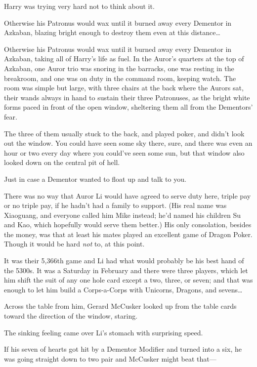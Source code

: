 Harry was trying very hard not to think about it.

Otherwise his Patronus would wax until it burned away every Dementor in
Azkaban, blazing bright enough to destroy them even at this distance{\ldots}

Otherwise his Patronus would wax until it burned away every Dementor in
Azkaban, taking all of Harry's life as fuel.
\later
In the Auror's quarters at the top of Azkaban, one Auror trio was snoring in
the barracks, one was resting in the breakroom, and one
was on duty in the command room, keeping watch. The room was
simple but large, with three chairs at the back where the Aurors sat, their wands
always in hand to sustain their three Patronuses, as the bright white forms
paced in front of the open window, sheltering them all from the Dementors' fear.

The three of them usually stuck to the back, and played poker, and didn't look
out the window. You could have seen some sky there, sure, and there was even an
hour or two every day where you could've seen some sun, but that window also
looked down on the central pit of hell.

Just in case a Dementor wanted to float up and talk to you.

There was no way that Auror Li would have agreed to serve duty here, triple pay
or no triple pay, if he hadn't had a family to support. (His real name was
Xiaoguang, and everyone called him Mike instead; he'd named his children Su and
Kao, which hopefully would serve them better.) His only consolation, besides
the money, was that at least his mates played an excellent game of Dragon
Poker. Though it would be hard \emph{not} to, at this point.

It was their 5,366th game and Li had what would probably be his best hand of
the 5300s. It was a Saturday in February and there were three players, which
let him shift the suit of any one hole card except a two, three, or seven; and
that was enough to let him build a Corps-a-Corps with Unicorns, Dragons, and
sevens{\ldots}

Across the table from him, Gerard McCusker looked up from the table cards
toward the direction of the window, staring.

The sinking feeling came over Li's stomach with surprising speed.

If his seven of hearts got hit by a Dementor Modifier and turned into a six, he
was going straight down to two pair and McCusker might beat that---

